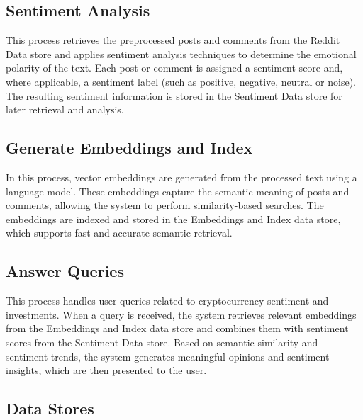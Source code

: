 \subsection{Sentiment Analysis}

This process retrieves the preprocessed posts and comments from the Reddit Data store and applies sentiment analysis techniques to determine the emotional polarity of the text. Each post or comment is assigned a sentiment score and, where applicable, a sentiment label (such as positive, negative, neutral or noise). The resulting sentiment information is stored in the Sentiment Data store for later retrieval and analysis.

\subsection{Generate Embeddings and Index}

In this process, vector embeddings are generated from the processed text using a language model. These embeddings capture the semantic meaning of posts and comments, allowing the system to perform similarity-based searches. The embeddings are indexed and stored in the Embeddings and Index data store, which supports fast and accurate semantic retrieval.

\subsection{Answer Queries}

This process handles user queries related to cryptocurrency sentiment and investments. When a query is received, the system retrieves relevant embeddings from the Embeddings and Index data store and combines them with sentiment scores from the Sentiment Data store. Based on semantic similarity and sentiment trends, the system generates meaningful opinions and sentiment insights, which are then presented to the user.

\subsection{Data Stores}

